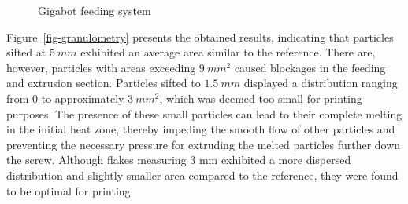 \documentclass[
  letterpaper,
  DIV=11,
  numbers=noendperiod]{scrartcl}
\begin{document}
\begin{figure}
\begin{minipage}[t]{0.40\linewidth}
{\centering 


\caption{\label{fig-crammer}Gigabot feeding system}

}

\end{minipage}%

\end{figure}

Figure~\ref{fig-granulometry} presents the obtained results, indicating
that particles sifted at \(5~mm\) exhibited an average area similar to
the reference. There are, however, particles with areas exceeding
\(9~mm^{2}\) caused blockages in the feeding and extrusion section.
Particles sifted to \(1.5~mm\) displayed a distribution ranging from 0
to approximately \(3~mm^{2}\), which was deemed too small for printing
purposes. The presence of these small particles can lead to their
complete melting in the initial heat zone, thereby impeding the smooth
flow of other particles and preventing the necessary pressure for
extruding the melted particles further down the screw. Although flakes
measuring 3 mm exhibited a more dispersed distribution and slightly
smaller area compared to the reference, they were found to be optimal
for printing.
\end{document}
